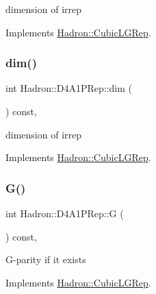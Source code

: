 dimension of irrep 

Implements \mbox{\hyperlink{structHadron_1_1CubicLGRep_a3acbaea26503ed64f20df693a48e4cdd}{Hadron\+::\+Cubic\+L\+G\+Rep}}.

\mbox{\label{structHadron_1_1D4A1PRep_a3b84dbb23476d76b192c0440aafb9e92}} 
\subsubsection{\texorpdfstring{dim()}{dim()}\hspace{0.1cm}{\footnotesize\ttfamily [3/3]}}
{\footnotesize\ttfamily int Hadron\+::\+D4\+A1\+P\+Rep\+::dim (\begin{DoxyParamCaption}{ }\end{DoxyParamCaption}) const\hspace{0.3cm}{\ttfamily [inline]}, {\ttfamily [virtual]}}

dimension of irrep 

Implements \mbox{\hyperlink{structHadron_1_1CubicLGRep_a3acbaea26503ed64f20df693a48e4cdd}{Hadron\+::\+Cubic\+L\+G\+Rep}}.

\mbox{\label{structHadron_1_1D4A1PRep_a51171e5c1f09171ff0bde566898e5780}} 
\subsubsection{\texorpdfstring{G()}{G()}\hspace{0.1cm}{\footnotesize\ttfamily [1/3]}}
{\footnotesize\ttfamily int Hadron\+::\+D4\+A1\+P\+Rep\+::G (\begin{DoxyParamCaption}{ }\end{DoxyParamCaption}) const\hspace{0.3cm}{\ttfamily [inline]}, {\ttfamily [virtual]}}

G-\/parity if it exists 

Implements \mbox{\hyperlink{structHadron_1_1CubicLGRep_ace26f7b2d55e3a668a14cb9026da5231}{Hadron\+::\+Cubic\+L\+G\+Rep}}.

\mbox{\label{structHadron_1_1D4A1PRep_a51171e5c1f09171ff0bde566898e5780}} 
